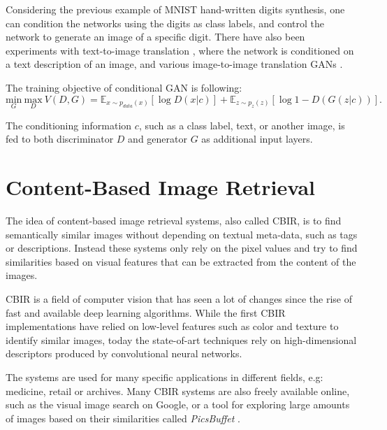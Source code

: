 \documentclass[12pt]{report}
\begin{document}
Considering the previous example of MNIST hand-written digits synthesis, one can condition the networks using the digits as class labels, and control the network to generate an image of a specific digit. There have also been experiments with text-to-image translation \cite{reed_generative_2016}, where the network is conditioned on a text description of an image, and various image-to-image translation GANs \cite{yoo_pixel-level_2016}\cite{yoo_pixel-level_2016}\cite{pathak_context_2016}.

The training objective of conditional GAN is following:
\begin{equation}
\underset{G}{\mathrm{min}} \ \underset{D}{\mathrm{max}} \ V(D,G) = \mathbb{E}_{x \sim p_{data}(x)}[\log D(x|c)] + \mathbb{E}_{z \sim p_{z}(z)}[\log 1 - D(G(z|c))].
\label{eq:cgan}
\end{equation}

The conditioning information $c$, such as a class label, text, or another image, is fed to both discriminator $D$ and generator $G$ as additional input layers.









\pagebreak
\section{Content-Based Image Retrieval}
The idea of content-based image retrieval systems, also called CBIR, is to find semantically similar images without depending on textual meta-data, such as tags or descriptions. Instead these systems only rely on the pixel values and try to find similarities based on visual features that can be extracted from the content of the images.

CBIR is a field of computer vision that has seen a lot of changes since the rise of fast and available deep learning algorithms. While the first CBIR implementations have relied on low-level features such as color and texture to identify similar images, today the state-of-art techniques rely on high-dimensional descriptors produced by convolutional neural networks.

The systems are used for many specific applications in different fields, e.g: medicine, retail or archives. Many CBIR systems are also freely available online, such as the visual image search on Google, or a tool for exploring large amounts of images based on their similarities called \textit{PicsBuffet} \cite{mackowiak_picsbuffet_nodate}.
\end{document}
